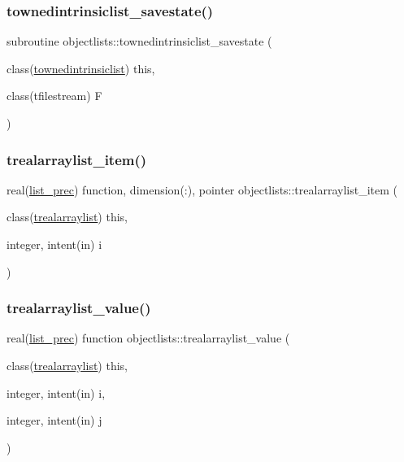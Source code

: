 \subsubsection{\texorpdfstring{townedintrinsiclist\+\_\+savestate()}{townedintrinsiclist\_savestate()}}
{\footnotesize\ttfamily subroutine objectlists\+::townedintrinsiclist\+\_\+savestate (\begin{DoxyParamCaption}\item[{class(\mbox{\hyperlink{structobjectlists_1_1townedintrinsiclist}{townedintrinsiclist}})}]{this,  }\item[{class(tfilestream)}]{F }\end{DoxyParamCaption})\hspace{0.3cm}{\ttfamily [private]}}

\mbox{\label{namespaceobjectlists_afec6c1eefcdae12eeddeb762eb1e24eb}} 
\subsubsection{\texorpdfstring{trealarraylist\+\_\+item()}{trealarraylist\_item()}}
{\footnotesize\ttfamily real(\mbox{\hyperlink{namespaceobjectlists_a9d176bc6347eefeceba8cb520c6be81c}{list\+\_\+prec}}) function, dimension(\+:), pointer objectlists\+::trealarraylist\+\_\+item (\begin{DoxyParamCaption}\item[{class(\mbox{\hyperlink{structobjectlists_1_1trealarraylist}{trealarraylist}})}]{this,  }\item[{integer, intent(in)}]{i }\end{DoxyParamCaption})\hspace{0.3cm}{\ttfamily [private]}}

\mbox{\label{namespaceobjectlists_a12e74f409aae2d6481803ca8e3348d2f}} 
\subsubsection{\texorpdfstring{trealarraylist\+\_\+value()}{trealarraylist\_value()}}
{\footnotesize\ttfamily real(\mbox{\hyperlink{namespaceobjectlists_a9d176bc6347eefeceba8cb520c6be81c}{list\+\_\+prec}}) function objectlists\+::trealarraylist\+\_\+value (\begin{DoxyParamCaption}\item[{class(\mbox{\hyperlink{structobjectlists_1_1trealarraylist}{trealarraylist}})}]{this,  }\item[{integer, intent(in)}]{i,  }\item[{integer, intent(in)}]{j }\end{DoxyParamCaption})\hspace{0.3cm}{\ttfamily [private]}}

